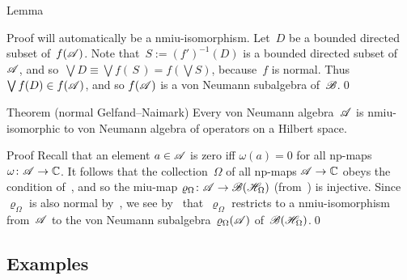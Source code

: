 \documentclass[a]{subfiles}
\begin{document}
\begin{parsec}
\begin{point}{Lemma}
\begin{point}{Proof}
will automatically be a nmiu-isomorphism.
Let~$D$ be a bounded directed subset of~$f(\mathscr{A})$.
Note that~$S:=(f')^{-1}(D)$ is a bounded
directed subset of~$\mathscr{A}$,
and so~$\bigvee D\equiv  \bigvee f(\,S\,)
= f(\bigvee S)$, because~$f$ is normal.
Thus~$\bigvee f(D)\in f(\mathscr{A})$,
and so $f(\mathscr{A})$ is a von Neumann subalgebra of~$\mathscr{B}$.\qed
\end{point}
\end{point}
\begin{point}[ngns]{Theorem (normal Gelfand--Naimark)}%
Every von Neumann algebra~$\mathscr{A}$ is nmiu-isomorphic
to von Neumann algebra of operators on a Hilbert space.
\begin{point}{Proof}%
Recall that an element $a\in \mathscr{A}$ is zero iff $\omega(a)=0$
for all np-maps $\omega\colon \mathscr{A}\to\mathbb{C}$.
It follows that the collection~$\Omega$
of all np-maps $\mathscr{A}\to\mathbb{C}$
obeys the condition of~,
and so the miu-map $\varrho_\Omega\colon \mathscr{A}\to\mathscr{B}(\mathscr{H}_\Omega)$
(from~)
is injective.
Since~$\varrho_\Omega$
is also normal by~,
we see by~ that~$\varrho_\Omega$
restricts to a nmiu-isomorphism
from~$\mathscr{A}$ to the von Neumann subalgebra~$\varrho_\Omega(\mathscr{A})$
of~$\mathscr{B}(\mathscr{H}_\Omega)$.\qed
\end{point}
\end{point}
\end{parsec}
\subsection{Examples}
\end{document}
